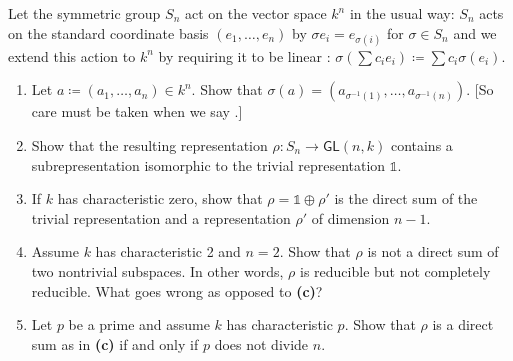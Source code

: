 \begin{problem}
Let the symmetric group $S_n$ act on the vector space $k^n$ in the usual way: $S_n$ acts on the standard coordinate basis $(e_1, \ldots, e_n)$ by $\sigma e_i=e_{\sigma(i)}$ for $\sigma \in S_n$ and we extend this action to $k^n$ by requiring it to be linear : $\sigma\left(\sum c_i e_i\right) \coloneqq \sum c_i \sigma(e_i)$. 
\begin{enumerate}[font=\normalfont,label=\textbf{(\alph*)}]

\item Let $a\coloneqq (a_1, \ldots, a_n) \in k^n$. Show that $\sigma(a) = (a_{\sigma^{-1}(1)}, \ldots , a_{\sigma^{-1}(n)})$. [So care must be taken when we say .]

\item Show that the resulting representation $\rho: S_n \to \mathsf{GL}(n, k)$ contains a subrepresentation isomorphic to the trivial representation $\mathbb{1}$. 
\item If $k$ has characteristic zero, show that $\rho = \mathbb{1} \oplus \rho'$ is the direct sum of the trivial representation and a representation $\rho'$ of dimension $n-1$. 

\item Assume $k$ has characteristic 2 and $n = 2$. Show that $\rho$ is not a direct sum of two nontrivial subspaces. In other words, $\rho$ is reducible but not completely reducible. What goes wrong as opposed to \textbf{(c)}?

\item Let $p$ be a prime and assume $k$ has characteristic $p$. Show that $\rho$ is a direct sum as in \textbf{(c)} if and only if $p$ does not divide $n$. 

\end{enumerate}
\end{problem}

